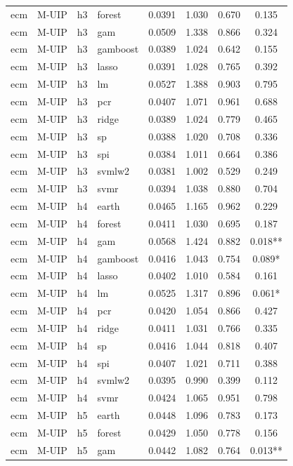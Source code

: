 \begin{ThreePartTable}
\begin{longtable}[t]{llclcccc}
ecm & M-UIP & h3 & forest & 0.0391 & 1.030 & 0.670 & 0.135\\
ecm & M-UIP & h3 & gam & 0.0509 & 1.338 & 0.866 & 0.324\\
ecm & M-UIP & h3 & gamboost & 0.0389 & 1.024 & 0.642 & 0.155\\
ecm & M-UIP & h3 & lasso & 0.0391 & 1.028 & 0.765 & 0.392\\
ecm & M-UIP & h3 & lm & 0.0527 & 1.388 & 0.903 & 0.795\\
ecm & M-UIP & h3 & pcr & 0.0407 & 1.071 & 0.961 & 0.688\\
ecm & M-UIP & h3 & ridge & 0.0389 & 1.024 & 0.779 & 0.465\\
ecm & M-UIP & h3 & sp & 0.0388 & 1.020 & 0.708 & 0.336\\
ecm & M-UIP & h3 & spi & 0.0384 & 1.011 & 0.664 & 0.386\\
ecm & M-UIP & h3 & svmlw2 & 0.0381 & 1.002 & 0.529 & 0.249\\
ecm & M-UIP & h3 & svmr & 0.0394 & 1.038 & 0.880 & 0.704\\
\addlinespace
ecm & M-UIP & h4 & earth & 0.0465 & 1.165 & 0.962 & 0.229\\
ecm & M-UIP & h4 & forest & 0.0411 & 1.030 & 0.695 & 0.187\\
ecm & M-UIP & h4 & gam & 0.0568 & 1.424 & 0.882 & 0.018**\\
ecm & M-UIP & h4 & gamboost & 0.0416 & 1.043 & 0.754 & 0.089*\\
ecm & M-UIP & h4 & lasso & 0.0402 & 1.010 & 0.584 & 0.161\\
ecm & M-UIP & h4 & lm & 0.0525 & 1.317 & 0.896 & 0.061*\\
ecm & M-UIP & h4 & pcr & 0.0420 & 1.054 & 0.866 & 0.427\\
ecm & M-UIP & h4 & ridge & 0.0411 & 1.031 & 0.766 & 0.335\\
ecm & M-UIP & h4 & sp & 0.0416 & 1.044 & 0.818 & 0.407\\
ecm & M-UIP & h4 & spi & 0.0407 & 1.021 & 0.711 & 0.388\\
ecm & M-UIP & h4 & svmlw2 & 0.0395 & 0.990 & 0.399 & 0.112\\
ecm & M-UIP & h4 & svmr & 0.0424 & 1.065 & 0.951 & 0.798\\
\addlinespace
ecm & M-UIP & h5 & earth & 0.0448 & 1.096 & 0.783 & 0.173\\
ecm & M-UIP & h5 & forest & 0.0429 & 1.050 & 0.778 & 0.156\\
ecm & M-UIP & h5 & gam & 0.0442 & 1.082 & 0.764 & 0.013**\\

\end{longtable}
\end{ThreePartTable}
